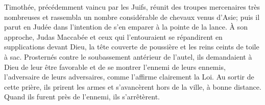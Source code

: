 Timothée, précédemment vaincu par les Juifs,
	réunit des troupes mercenaires très nombreuses
	et rassembla un nombre considérable de chevaux venus d’Asie;
	puis il parut en Judée dans l’intention de s’en emparer à la pointe de la lance.
À son approche,
	Judas Maccabée et ceux qui l’entouraient se répandirent en supplications devant Dieu,
	la tête couverte de poussière et les reins ceints de toile à sac.
Prosternés contre le soubassement antérieur de l’autel,
	ils demandaient à Dieu de leur être favorable
	et de se montrer l’ennemi de leurs ennemis, l’adversaire de leurs adversaires,
	comme l’affirme clairement la Loi.
Au sortir de cette prière, ils prirent les armes
	et s’avancèrent hors de la ville, à bonne distance.
	Quand ils furent près de l’ennemi, ils s’arrêtèrent.
